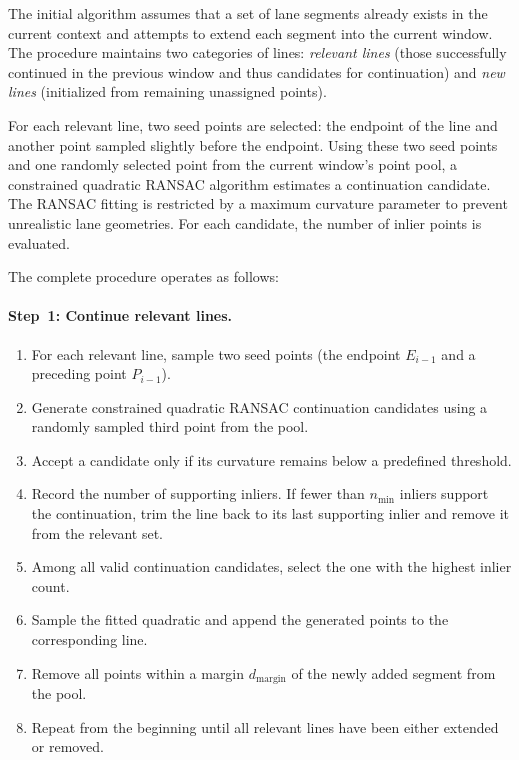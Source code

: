 The initial algorithm assumes that a set of lane segments already exists in the current context and attempts to extend each segment into the current window. The procedure maintains two categories of lines: \emph{relevant lines} (those successfully continued in the previous window and thus candidates for continuation) and \emph{new lines} (initialized from remaining unassigned points).

For each relevant line, two seed points are selected: the endpoint of the line and another point sampled slightly before the endpoint. Using these two seed points and one randomly selected point from the current window's point pool, a constrained quadratic RANSAC algorithm estimates a continuation candidate. The RANSAC fitting is restricted by a maximum curvature parameter to prevent unrealistic lane geometries. For each candidate, the number of inlier points is evaluated.

The complete procedure operates as follows:

\paragraph{Step~1: Continue relevant lines.}
\begin{enumerate}
  \item For each relevant line, sample two seed points (the endpoint $E_{i-1}$ and a preceding point $P_{i-1}$).
  \item Generate constrained quadratic RANSAC continuation candidates using a randomly sampled third point from the pool.
  \item Accept a candidate only if its curvature remains below a predefined threshold.
  \item Record the number of supporting inliers. If fewer than $n_{\min}$ inliers support the continuation, trim the line back to its last supporting inlier and remove it from the relevant set.
  \item Among all valid continuation candidates, select the one with the highest inlier count.
  \item Sample the fitted quadratic and append the generated points to the corresponding line.
  \item Remove all points within a margin $d_{\text{margin}}$ of the newly added segment from the pool.
  \item Repeat from the beginning until all relevant lines have been either extended or removed.
\end{enumerate}

